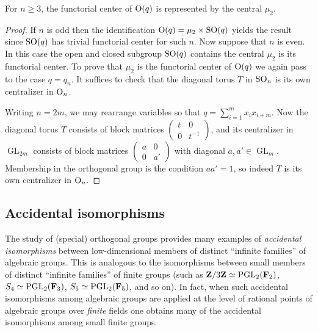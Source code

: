 \documentclass[10pt]{article}
\newcommand{\GL}{\operatorname{GL}}
\renewcommand{\(}{\left(}
\renewcommand{\)}{\right)}
\numberwithin{thm}{subsection}
\begin{document}
\begin{cor} For $n \ge 3$, the functorial center of ${\rm{O}}(q)$
is represented by the central $\mu_2$.
\end{cor}

\begin{proof}
If $n$ is odd then the identification ${\rm{O}}(q) = \mu_2 \times {\rm{SO}}(q)$
yields the result since ${\rm{SO}}(q)$ has trivial functorial center for such $n$.
Now suppose that $n$ is even.   In this case the open and closed subgroup 
${\rm{SO}}(q)$ contains the central $\mu_2$ is its functorial center.
To prove that $\mu_2$ is the functorial center 
of ${\rm{O}}(q)$ we again pass to the case $q = q_n$. 
 It suffices to check that the diagonal torus $T$ in ${\rm{SO}}_n$
is its own centralizer in ${\rm{O}}_n$.  

Writing $n = 2m$, we may rearrange variables
so that $q = \sum_{i=1}^m x_i x_{i+m}$.   
Now the diagonal torus $T$ consists of
block matrices $(\begin{smallmatrix} t & 0 \\ 0 & t^{-1} \end{smallmatrix})$,
and its centralizer in $\GL_{2m}$ consists of block matrices
$(\begin{smallmatrix} a & 0 \\ 0 & a' \end{smallmatrix})$
with diagonal $a, a' \in \GL_m$.  Membership in the orthogonal group
is the condition $aa' = 1$, so indeed $T$ is its own centralizer
in ${\rm{O}}_n$.
\end{proof}


\subsection{Accidental isomorphisms}\label{acc}

The study of (special) orthogonal groups provides many examples of 
{\em accidental isomorphisms} between low-dimensional members of 
distinct ``infinite families'' of algebraic groups.  This is analogous to 
the isomorphisms between small members of distinct ``infinite families''
of finite groups (such as ${\mathbf{Z}}/3{\mathbf{Z}} \simeq {\rm{PGL}}_2(\mathbf{F}_2)$,
$S_4 \simeq {\rm{PGL}}_2(\mathbf{F}_3)$, 
$S_5 \simeq {\rm{PGL}}_2(\mathbf{F}_5)$,
and so on). In fact, when such accidental isomorphisms among algebraic groups 
are applied at the level of rational points of algebraic groups over {\em finite} fields one
obtains many of the accidental isomorphisms among small finite groups.
\end{document}
